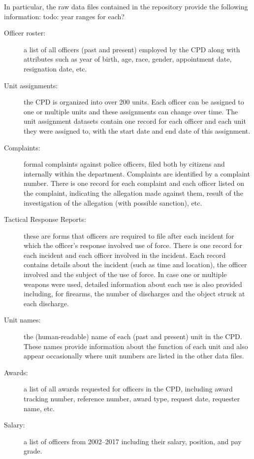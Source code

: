 In particular, the raw data files contained in the repository
provide the following information: {\color{red} todo: year ranges for each?}
\begin{description}
	\item[Officer roster:] a list of all officers (past and present) employed
		by the CPD along with attributes such as year of birth, age, race,
		gender, appointment date, resignation date, etc.
	\item[Unit assignments:] the CPD is organized into over 200 units.
		Each officer can be assigned to one or multiple units and these
		assignments can change over time. The unit assignment datasets contain
		one record for each officer and each unit they were assigned to, with
		the start date and end date of this assignment.
	\item[Complaints:] formal complaints against police officers, filed both by
		citizens and internally within the department. Complaints are
		identified by a complaint number. There is one record for each
		complaint and each officer listed on the complaint, indicating the
		allegation made against them, result of the investigation of the
		allegation (with possible sanction), etc.
	\item[Tactical Response Reports:] these are forms that officers are
		required to file after each incident for which the officer's response
		involved use of force. There is one record for each incident and each
		officer involved in the incident. Each record contains details about
		the incident (such as time and location), the officer involved and the
		subject of the use of force. In case one or multiple weapons were used,
		detailed information about each use is also provided including, for
		firearms, the number of discharges and the object struck at each
		discharge.
	\item[Unit names:] the (human-readable) name of each (past and present)
		unit in the CPD. These names provide information about the function of
		each unit and also appear occasionally where unit numbers are listed in
		the other data files.
	\item[Awards:] a list of all awards requested for officers in the CPD,
		including award tracking number, reference number, award type, request
		date, requester name, etc.
	\item[Salary:] a list of officers from 2002--2017 including their salary,
		position, and pay grade.
\end{description}

